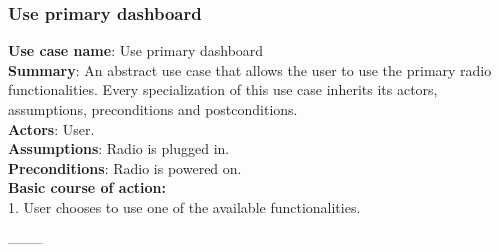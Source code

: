 \documentclass[11pt]{article}
\begin{document}
\subsubsection{Use primary dashboard}
\textbf{Use case name}: Use primary dashboard\\
\textbf{Summary}: An abstract use case that allows the user to use the primary radio functionalities. Every specialization of this use case inherits its actors, assumptions, preconditions and postconditions.\\
\textbf{Actors}: User.\\
\textbf{Assumptions}: Radio is plugged in.\\
\textbf{Preconditions}: Radio is powered on.\\
\textbf{Basic course of action:}\\
\hspace*{10mm}1. User chooses to use one of the available functionalities.
\begin{center}--------\end{center}
\end{document}
